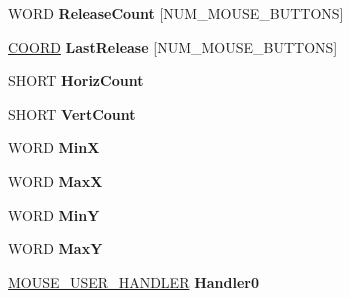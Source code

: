 \begin{DoxyCompactItemize}
\mbox{\label{struct___m_o_u_s_e___d_r_i_v_e_r___s_t_a_t_e_af1920120526cb99f484e670295bfbc7a}} 
W\+O\+RD {\bfseries Release\+Count} \mbox{[}N\+U\+M\+\_\+\+M\+O\+U\+S\+E\+\_\+\+B\+U\+T\+T\+O\+NS\mbox{]}
\item 
\mbox{\label{struct___m_o_u_s_e___d_r_i_v_e_r___s_t_a_t_e_a11e2bdd8fb730c57cec13665d1ff54ce}} 
\hyperlink{struct___c_o_o_r_d}{C\+O\+O\+RD} {\bfseries Last\+Release} \mbox{[}N\+U\+M\+\_\+\+M\+O\+U\+S\+E\+\_\+\+B\+U\+T\+T\+O\+NS\mbox{]}
\item 
\mbox{\label{struct___m_o_u_s_e___d_r_i_v_e_r___s_t_a_t_e_a1b079cf9c960797cabcdeb63822413f3}} 
S\+H\+O\+RT {\bfseries Horiz\+Count}
\item 
\mbox{\label{struct___m_o_u_s_e___d_r_i_v_e_r___s_t_a_t_e_a6e32dee0aa38fe9f0048ea1284d1cdb5}} 
S\+H\+O\+RT {\bfseries Vert\+Count}
\item 
\mbox{\label{struct___m_o_u_s_e___d_r_i_v_e_r___s_t_a_t_e_a846100d2ac81dbffa874c4e2201e0273}} 
W\+O\+RD {\bfseries MinX}
\item 
\mbox{\label{struct___m_o_u_s_e___d_r_i_v_e_r___s_t_a_t_e_af25c1ba77e52add4da664d1daa5b2b18}} 
W\+O\+RD {\bfseries MaxX}
\item 
\mbox{\label{struct___m_o_u_s_e___d_r_i_v_e_r___s_t_a_t_e_a0645bb53cc5c272165d7287b8493ad08}} 
W\+O\+RD {\bfseries MinY}
\item 
\mbox{\label{struct___m_o_u_s_e___d_r_i_v_e_r___s_t_a_t_e_aae557736b300cc0ca33cc9313494aa88}} 
W\+O\+RD {\bfseries MaxY}
\item 
\mbox{\label{struct___m_o_u_s_e___d_r_i_v_e_r___s_t_a_t_e_a2fe506ff574957cdfc7e4296e24348fa}} 
\hyperlink{struct___m_o_u_s_e___u_s_e_r___h_a_n_d_l_e_r}{M\+O\+U\+S\+E\+\_\+\+U\+S\+E\+R\+\_\+\+H\+A\+N\+D\+L\+ER} {\bfseries Handler0}

\end{DoxyCompactItemize}

